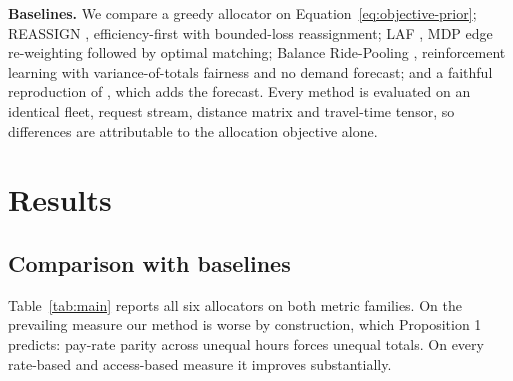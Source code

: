 \documentclass[10pt,twocolumn]{article}
\begin{document}
\textbf{Baselines.} We compare a greedy allocator on Equation~\ref{eq:objective-prior}; REASSIGN \cite{lesmana2019}, efficiency-first with bounded-loss reassignment; LAF \cite{shi2021}, MDP edge re-weighting followed by optimal matching; Balance Ride-Pooling \cite{raman2021}, reinforcement learning with variance-of-totals fairness and no demand forecast; and a faithful reproduction of \cite{kang2024}, which adds the forecast. Every method is evaluated on an identical fleet, request stream, distance matrix and travel-time tensor, so differences are attributable to the allocation objective alone.


\section{Results}
\subsection{Comparison with baselines}
Table~\ref{tab:main} reports all six allocators on both metric families. On the prevailing measure our method is worse by construction, which Proposition 1 predicts: pay-rate parity across unequal hours forces unequal totals. On every rate-based and access-based measure it improves substantially.
\end{document}
